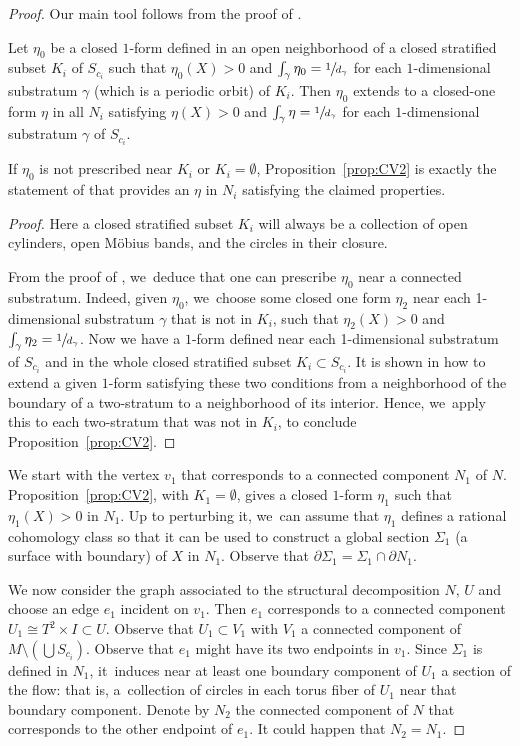 \begin{proof}
Our main tool follows from the proof of \cite[Prop.\,2.8]{CV2}.

\begin{prop}\label{prop:CV2}
Let $\eta_0$ be a closed $1$-form defined in an open neighborhood of a closed stratified subset $K_i$ of $S_{c_i}$ such that $\eta_0(X)>0$ and $\int_{\gamma}\eta_0=\sfrac{1}{d_{\gamma}}$ for each $1$-dimensional substratum $\gamma$ (which is a periodic orbit) of $K_i$. Then $\eta_0$ extends to a closed-one form $\eta$ in all $N_i$ satisfying $\eta(X)>0$ and $\int_{\gamma} \eta=\sfrac{1}{d_{\gamma}}$ for each $1$-dimensional substratum $\gamma$ of $S_{c_i}$.
\end{prop}

If $\eta_0$ is not prescribed near $K_i$ or $K_i=\emptyset$, Proposition~\ref{prop:CV2} is exactly the statement of \cite[Prop.\,2.8]{CV2} that provides an $\eta$ in $N_i$ satisfying the claimed properties.

\begin{proof}
Here a closed stratified subset $K_i$ will always be a collection of open cylinders, open Möbius bands, and the circles in their closure.\enlargethispage{.5\baselineskip}%

From the proof of \cite[Prop.\,2.8]{CV2}, we~deduce that one can prescribe $\eta_0$ near a connected substratum. Indeed, given $\eta_0$, we~choose some closed one form $\eta_2$ near each 1-dimensional substratum $\gamma$ that is not in $K_i$, such that $\eta_2(X)>0$ and $\int_{\gamma}\eta_2=\sfrac{1}{d_{\gamma}}$. Now we have a $1$-form defined near each 1-dimensional substratum of $S_{c_i}$ and in the whole closed stratified subset $K_i\subset S_{c_i}$. It is shown in \cite[\S 2, p.\,463--464]{CV2} how to extend a given $1$-form satisfying these two conditions from a neighborhood of the boundary of a two-stratum to a neighborhood of its interior. Hence, we~apply this to each two-stratum that was not in $K_i$, to conclude Proposition~\ref{prop:CV2}.
\end{proof}

We start with the vertex $v_1$ that corresponds to a connected component $N_1$ of $N$. Proposition~\ref{prop:CV2}, with $K_1=\emptyset$, gives a closed $1$-form $\eta_1$ such that $\eta_1(X)>0$ in $N_1$. Up to perturbing it, we~can assume that $\eta_1$ defines a rational cohomology class so that it can be used to construct a global section $\Sigma_1$ (a surface with boundary) of $X$ in $N_1$. Observe that $\partial\Sigma_1=\Sigma_1\cap \partial N_1$.

We now consider the graph associated to the structural decomposition $N$, $U$ and choose an edge $e_1$ incident on $v_1$. Then $e_1$ corresponds to a connected component $U_1\cong T^2\times I\subset U$. Observe that $U_1\subset V_1$ with $V_1$ a connected component of $M\setminus \left( \bigcup S_{c_i} \right)$. Observe that $e_1$ might have its two endpoints in $v_1$. Since $\Sigma_1$ is defined in $N_1$, it~induces near at least one boundary component of $U_1$ a section of the flow: that is, a~collection of circles in each torus fiber of $U_1$ near that boundary component. Denote by $N_2$ the connected component of $N$ that corresponds to the other endpoint of $e_1$. It could happen that $N_2=N_1$.


\end{proof}
